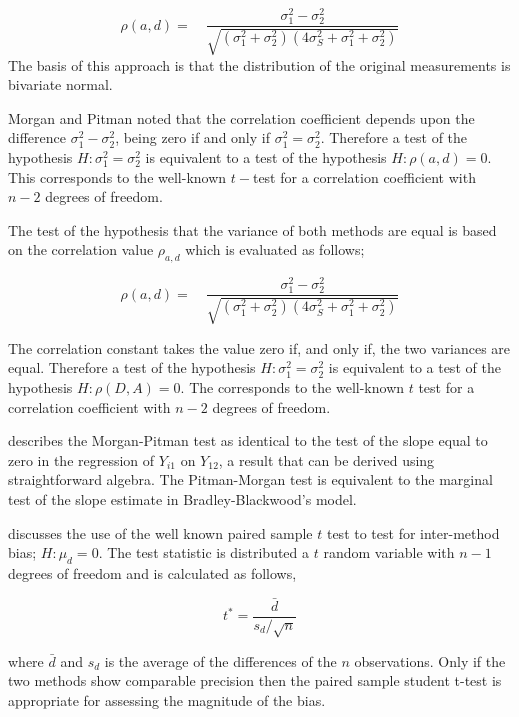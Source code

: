 \documentclass[12pt, a4paper]{report}
\theoremstyle{plain}
\theoremstyle{definition}
\theoremstyle{remark}
\begin{document}
\begin{equation}
\rho(a,d)=\quad\frac{\sigma^{2}_{1}-\sigma^{2}_{2}}{\sqrt{(\sigma^{2}_{1}+\sigma^{2}_{2})(4\sigma^{2}_{S}+\sigma^{2}_{1}+\sigma^{2}_{2})}}
\end{equation}
The basis of this approach is that the
distribution of the original measurements is bivariate normal.

Morgan and Pitman noted that the correlation coefficient depends
upon the difference $\sigma^{2}_{1}- \sigma^{2}_{2}$, being zero
if and only if $\sigma^{2}_{1}=\sigma^{2}_{2}$.
Therefore a test of the hypothesis $H: \sigma^{2}_{1}=\sigma^{2}_{2}$ is equivalent to a test of the hypothesis $H: \rho(a,d) = 0$. This corresponds to the well-known $t-$test for a correlation coefficient with $n-2$ degrees of freedom. 


The test of the hypothesis that the variance of both methods are
equal is based on the correlation value $\rho_{a,d}$ which is
evaluated as follows;




\begin{equation}
\rho(a,d)=\quad\frac{\sigma^{2}_{1}-\sigma^{2}_{2}}{\sqrt{(\sigma^{2}_{1}+\sigma^{2}_{2})(4\sigma^{2}_{S}+\sigma^{2}_{1}+\sigma^{2}_{2})}}
\end{equation}

The correlation constant takes the value zero if, and only if, the two variances are equal. Therefore a test of the hypothesis $H: \sigma^{2}_{1}=\sigma^{2}_{2}$ is equivalent to a test of the hypothesis $H: \rho(D,A) = 0$. The corresponds to the well-known
$t$ test for a correlation coefficient with $n-2$ degrees of freedom.


\citet{Bartko} describes the Morgan-Pitman test as identical to the test of the slope equal to zero in the regression of $Y_{i1}$ on $Y_{12}$, a result that can be derived using straightforward algebra. The Pitman-Morgan test is equivalent to the marginal test of the slope estimate in Bradley-Blackwood’s model.

\citet{Bartko} discusses the use of the well known paired sample $t$ test to test for inter-method bias; $H: \mu_{d}=0$. The test statistic is distributed a $t$ random variable with $n-1$ degrees of freedom and is calculated as follows,

\begin{equation}
t^{*} = \frac{\bar{d}}{s_{d}/\sqrt{n}}
\end{equation}

where $\bar{d}$ and $s_{d}$ is the average of the differences of
the $n$ observations. Only if the two methods show comparable precision then the paired sample student t-test is appropriate for assessing the magnitude of the bias.
\end{document}
